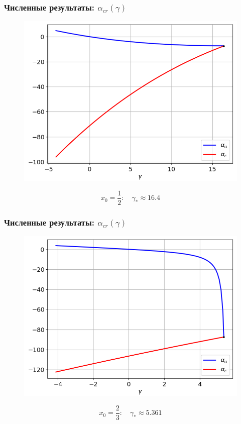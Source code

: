 \documentclass[fullscreen=true, unicode, bookmarks=false]{beamer}
\begin{document}
\begin{frame}
\frametitle{ Численные результаты: $ \alpha_{cr}(\gamma) $ }

\begin{figure} 
\includegraphics[scale=0.53]{alphas_12.png}  
\end{figure}

$$ x_0 = \frac{1}{2}: \quad \gamma_* \approx 16.4 $$

\end{frame}

\begin{frame}
\frametitle{ Численные результаты: $ \alpha_{cr}(\gamma) $ }

\begin{figure} 
\includegraphics[scale=0.53]{alphas_23.png}  
\end{figure}

$$ x_0 = \frac{2}{3}: \quad \gamma_* \approx 5.361 $$

\end{frame}
\end{document}
